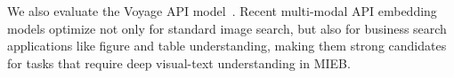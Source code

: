 
We also evaluate the Voyage API model~\citep{voyagemultimodal2024voyage}. Recent multi-modal API embedding models optimize not only for standard image search, but also for business search applications like figure and table understanding, making them strong candidates for tasks that require deep visual-text understanding in MIEB.